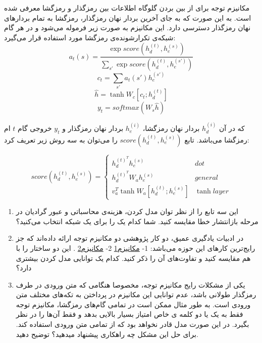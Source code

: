 مکانیزم توجه برای از بین بردن گلوگاه اطلاعات بین رمزگذار و رمزگشا معرفی شده است. به این صورت که به جای آخرین بردار نهان رمزگذار، رمزگشا به تمام بردارهای نهان رمزگذار دسترسی دارد. این مکانیزم به صورت زیر فرموله می‌شود و در هر گام شبکه‌ی تکرارشونده‌ی رمزگشا مورد استفاده قرار می‌گیرد:
\begin{equation}
	{a_t}\left( s \right) = \frac{{\exp score\left( {h_d^{\left( t \right)},h_e^{\left( s \right)}} \right)}}{{\sum\limits_{s'} {\exp score\left( {h_d^{\left( t \right)},h_e^{\left( {s'} \right)}} \right)} }}
\end{equation}
\begin{equation}
	{c_t} = \sum\limits_{s'} {{a_t}\left( {s'} \right)h_e^{\left( {s'} \right)}} 
\end{equation}
\begin{equation}
	\hat h = \tanh {W_c}\left[ {{c_t};h_d^{\left( t \right)}} \right]
\end{equation}
\begin{equation}
	{y_t} = softmax \left( {{W_s}\hat h} \right)
\end{equation}

که در آن
${h_d^{\left( i \right)}}$
بردار نهان رمزگشا،
${h_e^{\left( i \right)}}$
بردار نهان رمزگذار و
$y_t$
خروجی گام
$t$
ام رمزگشا می‌باشد. تابع
${score\left( {h_d^{\left( t \right)},h_e^{\left( s \right)}} \right)}$
را می‌توان به سه روش زیر تعریف کرد:
 
$$
score\left( {h_d^{\left( t \right)},h_e^{\left( s \right)}} \right) = \left\{ {\begin{array}{*{20}{c}}
		{h_d^{{{\left( t \right)}^T}}h_e^{\left( s \right)}}&{dot}\\
		{h_d^{{{\left( t \right)}^T}}{W_a}h_e^{\left( s \right)}}&{general}\\
		{v_a^T\tanh {W_a}\left[ {h_d^{\left( t \right)};h_e^{\left( s \right)}} \right]}&{\tanh layer}
\end{array}} \right.
$$

\begin{enumerate}[label=(\alph*)]
	\item
	این سه تابع را از نظر توان مدل کردن، هزینه‌ی محاسباتی و عبور گرادیان در مرحله بازانتشار خطا مقایسه کنید. شما کدام یک را برای یک شبکه
	انتخاب می‌کنید؟
	\item
	در ادبیات یادگیری عمیق، دو کار پژوهشی دو مکانیزم توجه ارائه داده‌اند که جز رایج‌ترین کار‌های این حوزه می‌باشد: 1-
	\href{https://arxiv.org/abs/1409.0473}{مکانیزم1}
	2-
	\href{https://arxiv.org/abs/1508.04025}{مکانیزم2}
	.
	این دو ساختار را با هم مقایسه کنید و تفاوت‌های آن را ذکر کنید. کدام یک توانایی مدل کردن بیشتری دارد؟
	\item
	یکی از مشکلات رایج مکانیزم توجه، مخصوصا هنگامی که متن ورودی در طرف رمزگذار طولانی باشد، عدم توانایی این مکانیزم در پرداختن به تکه‌های مختلف متن ورودی است. به طور مثال ممکن است در تمامی گام‌های رمزگشا، مکانیزم توجه فقط به یک یا دو کلمه ی خاص امتیاز بسیار بالایی بدهد و فقط آن‌ها را در نظر بگیرد. در این صورت مدل قادر نخواهد بود که از تمامی متن ورودی استفاده کند. برای حل این مشکل چه راهکاری پیشنهاد میدهید؟ توضیح دهید.
\end{enumerate}